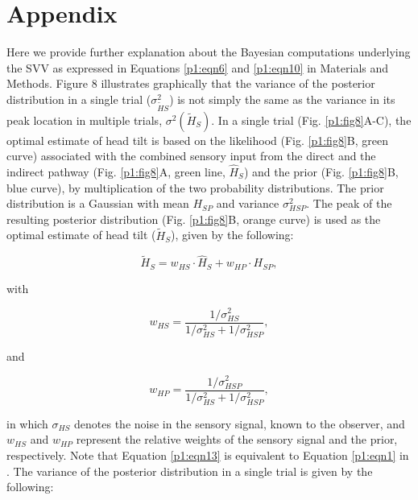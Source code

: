 \section{Appendix}
\label{p1:sec:appendix}

Here we provide further explanation about the Bayesian computations underlying the SVV as expressed in Equations \ref{p1:eqn6} and \ref{p1:eqn10} in Materials and Methods. Figure 8 illustrates graphically that the variance of the posterior distribution in a single trial ($\sigma^2_{\tilde{H}S}$) is not simply the same as the variance in its peak location in multiple trials, $\sigma^2(\tilde{H}_S)$. In a single trial (Fig. \ref{p1:fig8}A-C), the optimal estimate of head tilt is based on the likelihood (Fig. \ref{p1:fig8}B, green curve) associated with the combined sensory input from the direct and the indirect pathway (Fig. \ref{p1:fig8}A, green line, $\hat{H}_S$) and the prior (Fig. \ref{p1:fig8}B, blue curve), by multiplication of the two probability distributions. The prior distribution is a Gaussian with mean $H_{SP}$ and variance $\sigma^2_{HSP}$. The peak of the resulting posterior distribution (Fig. \ref{p1:fig8}B, orange curve) is used as the optimal estimate of head tilt ($\tilde{H}_S$), given by the following: 

\begin{equation}
\label{p1:eqn13}
\tilde{H}_S = w_{HS} \cdot \hat{H}_S + w_{HP} \cdot H_{SP},
\end{equation}

with

\begin{equation}
\label{p1:eqn14}
w_{HS} = \frac{1 / \sigma^2_{HS}}{1 / \sigma^2_{HS} + 1 / \sigma^2_{HSP}},
\end{equation}

and

\begin{equation}
\label{p1:eqn15}
w_{HP} = \frac{1 / \sigma^2_{HSP}}{1 / \sigma^2_{HS} + 1 / \sigma^2_{HSP}},
\end{equation}

in which $\sigma_{HS}$ denotes the noise in the sensory signal, known to the observer, and $w_{HS}$ and $w_{HP}$ represent the relative weights of the sensory signal and the prior, respectively. Note that Equation \ref{p1:eqn13} is equivalent to Equation \ref{p1:eqn1} in . The variance of the posterior distribution in a single trial is given by the following: 

